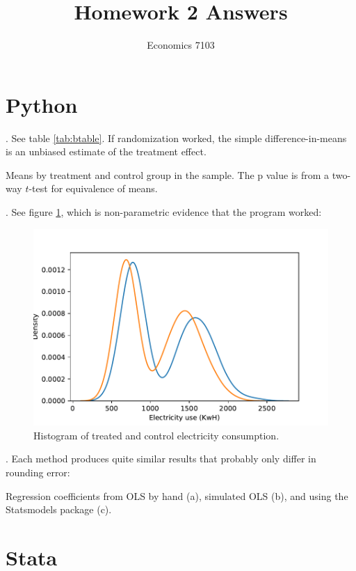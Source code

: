 \documentclass{article}
\title{Homework 2 Answers}
\author{Economics 7103}
\date{ }
\begin{document}
  
\maketitle

\section{Python}
. See table \ref{tab:btable}.  If randomization worked, the simple difference-in-means is an unbiased estimate of the treatment effect.
\begin{table}[h]
    \centering
    
    \caption{Means by treatment and control group in the sample.  The p value is from a two-way $t$-test for equivalence of means.}
    \label{tab:btable}
\end{table}

. See figure \ref{fig:treatmenthist}, which is non-parametric evidence that the program worked:
\begin{figure}[h]
    \centering
    \includegraphics[scale=0.7]{treatmenthist.pdf}
    \caption{Histogram of treated and control electricity consumption.}
    \label{fig:treatmenthist}
\end{figure}

. Each method produces quite similar results that probably only differ in rounding error:
\begin{table}[h]
    \centering
   
    \caption{Regression coefficients from OLS by hand (a), simulated OLS (b), and using the Statsmodels package (c).}
    \label{tab:outputtable3}
\end{table}
\section{Stata}
\end{document}
